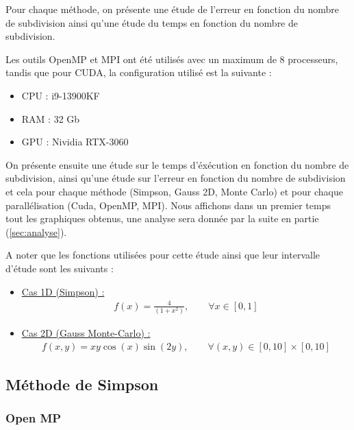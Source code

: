 \documentclass[10pt,a4paper]{article}
\begin{document}
Pour chaque méthode, on présente une étude de l'erreur en fonction du nombre de subdivision ainsi qu'une étude du temps en fonction du nombre de subdivision.

Les outils OpenMP et MPI ont été utilisés avec un maximum de 8 processeurs, tandis que pour CUDA, la configuration utilisé est la suivante : 
\begin{itemize}
    \item CPU : i9-13900KF
    \item RAM : 32 Gb
    \item GPU : Nividia RTX-3060
\end{itemize}

On présente ensuite une étude sur le temps d'éxécution en fonction du nombre de subdivision, ainsi qu'une étude sur l'erreur en fonction du nombre de subdivision et cela pour chaque méthode (Simpson, Gauss 2D, Monte Carlo) et pour chaque parallélisation (Cuda, OpenMP, MPI).
Nous affichons dans un premier temps tout les graphiques obtenus, une analyse sera donnée par la suite en partie (\ref{sec:analyse}).

A noter que les fonctions utilisées pour cette étude ainsi que leur intervalle d'étude sont les suivants : 

\begin{itemize}
  \item \underline{Cas 1D (Simpson) :}
  \begin{align*}
    f(x) = \frac{4}{ (1+ x^2)}, \qquad \forall x \in [0,1]
  \end{align*}
  \item \underline{Cas 2D (Gauss Monte-Carlo) :} 
  \begin{align*}
    f(x,y) = x y \cos(x) \sin(2y) , \qquad \forall (x,y) \in [0,10]\times[0,10]
  \end{align*}
\end{itemize}




\subsection{Méthode de Simpson}

\subsubsection{Open MP}
\end{document}
